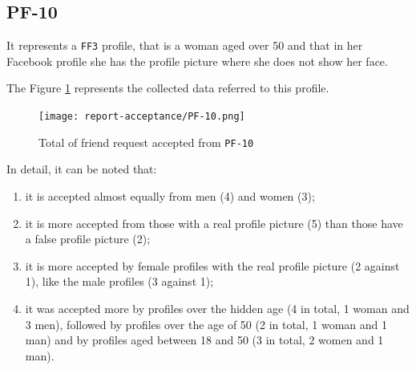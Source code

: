 \subsection*{PF-10}
It represents a \texttt{FF3} profile, that is a woman aged over 50 and that in her Facebook profile she has the profile picture where she does not show her face.
\par \noindent The Figure \ref{fig:accepted-from-PF10} represents the collected data referred to this profile.
\begin{figure}[H]	
	\centering
	\texttt{[image: report-acceptance/PF-10.png]} 
	\caption{Total of friend request accepted from \texttt{PF-10}}
	\label{fig:accepted-from-PF10}
\end{figure}
\par \noindent In detail, it can be noted that:
\begin{enumerate}		
	\item it is accepted almost equally from men (4) and women (3);
	\item it is more accepted from those with a real profile picture (5) than those have a false profile picture (2);
	\item it is more accepted by female profiles with the real profile picture (2 against 1), like the male profiles (3 against 1);
	\item it was accepted more by profiles over the hidden age (4 in total, 1 woman and 3 men), followed by profiles over the age of 50 (2 in total, 1 woman and 1 man) and by profiles aged between 18 and 50  (3 in total, 2 women and 1 man).
\end{enumerate}



